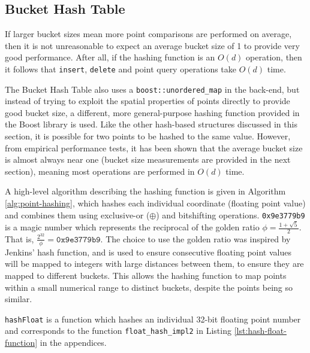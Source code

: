\subsection{Bucket Hash Table}


If larger bucket sizes mean more point comparisons are performed on average, then it is not unreasonable to expect an average bucket size of 1 to provide very good performance. After all, if the hashing function is an $O(d)$ operation, then it follows that \texttt{insert}, \texttt{delete} and point query operations take $O(d)$ time. 

The Bucket Hash Table also uses a \texttt{boost::unordered\_map} in the back-end, but instead of trying to exploit the spatial properties of points directly to provide good bucket size, a different, more general-purpose hashing function provided in the Boost library is used. Like the other hash-based structures discussed in this section, it is possible for two points to be hashed to the same value. However, from empirical performance tests, it has been shown that the average bucket size is almost always near one (bucket size measurements are provided in the next section), meaning most operations are performed in $O(d)$ time.

A high-level algorithm describing the hashing function is given in Algorithm \ref{alg:point-hashing}, which hashes each individual coordinate (floating point value) and combines them using exclusive-or ($\oplus$) and bitshifting operations. \texttt{0x9e3779b9} is a magic number which represents the reciprocal of the golden ratio $\phi = \frac{1 + \sqrt{5}}{2}$. That is, $\frac{2^{32}}{\phi} = \texttt{0x9e3779b9}$. The choice to use the golden ratio was inspired by Jenkins' hash function\cite{hash-combine}, and is used to ensure consecutive floating point values will be mapped to integers with large distances between them, to ensure they are mapped to different buckets. This allows the hashing function to map points within a small numerical range to distinct buckets, despite the points being so similar.

\texttt{hashFloat} is a function which hashes an individual 32-bit floating point number and corresponds to the function \texttt{float\_hash\_impl2} in Listing \ref{lst:hash-float-function} in the appendices.

